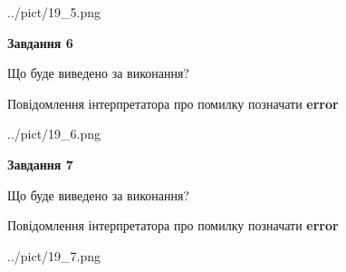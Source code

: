 \documentclass[10pt, ukrainian]{article}
\begin{document}
{\begin {large}
\begin{center}
	{../pict/19_5.png}
\end{center}
\newpage

{\begin {center}\textbf{Завдання 6}\end {center}}\par
Що буде виведено за виконання? \par
Повідомлення інтерпретатора про помилку позначати \textbf{error}

\begin{center}
	{../pict/19_6.png}
\end{center}
\newpage

{\begin {center}\textbf{Завдання 7}\end {center}}\par
Що буде виведено за виконання? \par
Повідомлення інтерпретатора про помилку позначати \textbf{error}

\begin{center}
	{../pict/19_7.png}
\end{center}
\newpage

\end {large}}
\end{document}

